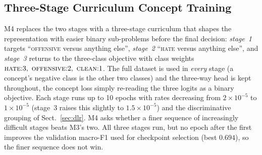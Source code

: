 \subsection{Three-Stage Curriculum Concept Training}
\label{sec:curriculum}

M4 replaces the two stages with a three-stage curriculum
\cite{bengio2009curriculum} that shapes the representation with easier binary
sub-problems before the final decision: \emph{stage~1} targets
``\textsc{offensive} versus anything else'', \emph{stage~2} ``\textsc{hate} versus
anything else'', and \emph{stage~3} returns to the three-class objective with
class weights $\textsc{hate}{:}3,\ \textsc{offensive}{:}2,\ \textsc{clean}{:}1$.
The full dataset is used in \emph{every} stage (a concept's negative class is the
other two classes) and the three-way head is kept throughout, the concept loss
simply re-reading the three logits as a binary objective.  Each stage runs up to 10
epochs with rates decreasing from $2\times10^{-5}$ to $1\times10^{-5}$
(stage~3 raises this slightly to $1.5\times10^{-5}$) and the discriminative
grouping of Sect.~\ref{sec:dlr}.  M4
asks whether a finer sequence of increasingly difficult stages beats M3's two.
All three stages run, but no epoch after the first improves the validation
macro-F1 used for checkpoint selection (best $0.694$), so the finer sequence does
not win.
